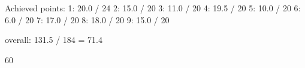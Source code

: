 Achieved points:
1: 20.0 / 24
2: 15.0 / 20
3: 11.0 / 20
4: 19.5 / 20
5: 10.0 / 20
6:  6.0 / 20
7: 17.0 / 20
8: 18.0 / 20
9: 15.0 / 20

overall: 131.5 / 184 = 71.4%


60%

